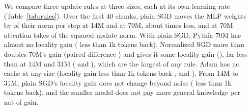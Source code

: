 \documentclass[times,twocolumn,final,authoryear]{elsarticle}
\begin{document}
We compare three update rules at three sizes, each at its own learning rate (Table~\ref{tab:rules}).
Over the first 40 chunks, plain SGD moves the MLP weights by \relMlpFourteen{} of their norm per step at 14M and \relMlpSeventy{} at 70M, about \mlpStepRatio{} times less, and at 70M attention takes \shareAttnSeventy{} of the squared update norm.
With plain SGD, Pythia-70M has almost no locality gain (\rLocOneKSgdSeventyPM{} less than 1k tokens back).
Normalized SGD more than doubles 70M's gain (paired difference \nsgdMinusSgdGainSeventyPM{}) and gives it some locality gain (\rLocOneKNsgdSeventyPM{}), far less than at 14M and 31M (\rLocOneKNsgdFourteenPM{} and \rLocOneKNsgdThirtyOnePM{}), which are the largest of any rule.
Adam has no cache at any size (locality gain less than 1k tokens back \rLocOneKAdamFourteenPM{}, \rLocOneKAdamThirtyOnePM{} and \rLocOneKAdamSeventyPM{}).
From 14M to 31M, plain SGD's locality gain does not change beyond noise (\locDiffThirtyOneFourteenOneKPM{} less than 1k tokens back), and the smaller model does not pay more general knowledge per nat of gain.
\end{document}
